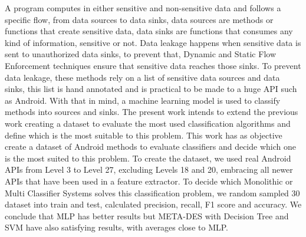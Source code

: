 A program computes in either sensitive and non-sensitive data and follows a specific flow, from data sources to data sinks, data sources are methods or functions that create sensitive data, data sinks are functions that consumes any kind of information, sensitive or not. Data leakage happens when sensitive data is sent to unauthorized data sinks, to prevent that, Dynamic and Static Flow Enforcement techniques ensure that sensitive data reaches those sinks. To prevent data leakage, these methods rely on a list of sensitive data sources and data sinks, this list is hand annotated and is practical to be made to a huge API such as Android. With that in mind, a machine learning model is used to classify methods into sources and sinks. The present work intends to extend the previous work creating a dataset to evaluate the most used classification algorithms and define which is the most suitable to this problem. This work has as objective create a dataset of Android methods to evaluate classifiers and decide which one is the most suited to this problem. To create the dataset, we used real Android APIs from Level 3 to Level 27, excluding Levels 18 and 20, embracing all newer APIs that have been used in a feature extractor. To decide which Monolithic or Multi Classifier Systems solves this classification problem, we random sampled 30 dataset into train and test, calculated precision, recall, F1 score and accuracy. We conclude that MLP has better results but META-DES with Decision Tree and SVM have also satisfying results, with averages close to MLP.
